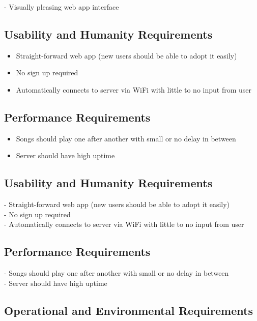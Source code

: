 \documentclass[12pt, titlepage]{article}
\begin{document}
- Visually pleasing web app interface

\subsection{Usability and Humanity Requirements}

\begin{itemize}
\item Straight-forward web app (new users should be able to adopt it easily)
\item No sign up required
\item Automatically connects to server via WiFi with little to no input from user
\end{itemize}
\subsection{Performance Requirements}

\begin{itemize}
\item Songs should play one after another with small or no delay in between
\item Server should have high uptime
\end{itemize}

\subsection{Usability and Humanity Requirements}

- Straight-forward web app (new users should be able to adopt it easily) \\
- No sign up required \\
- Automatically connects to server via WiFi with little to no input from user \\

\subsection{Performance Requirements}

- Songs should play one after another with small or no delay in between \\
- Server should have high uptime \\

\subsection{Operational and Environmental Requirements}
\end{document}
